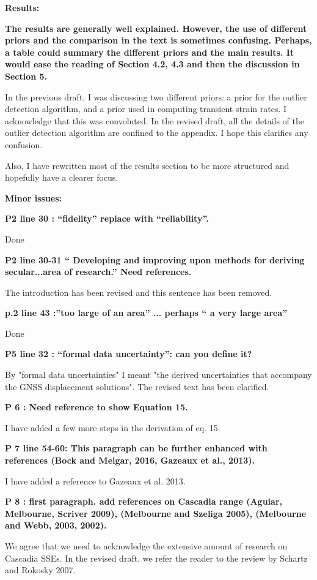 \documentclass[10pt,a4paper]{letter}
\begin{document}
\begin{letter}{}
\textbf{Results:}

\textbf{The results are generally well explained. However, the use of
different priors and the comparison in the text is sometimes
confusing. Perhaps, a table could summary the different priors and the
main results. It would ease the reading of Section 4.2, 4.3 and then
the discussion in Section 5.}

In the previous draft, I was discussing two different priors: a prior
for the outlier detection algorithm, and a prior used in computing
transient strain rates. I acknowledge that this was convoluted. In the
revised draft, all the details of the outlier detection algorithm are
confined to the appendix. I hope this clarifies any confusion.

Also, I have rewritten most of the results section to be more
structured and hopefully have a clearer focus.

\textbf{Minor issues:}

\textbf{P2 line 30 : “fidelity” replace with “reliability”.}

Done

\textbf{P2 line 30-31 “ Developing and improving upon methods for deriving
secular...area of research.” Need references.}

The introduction has been revised and this sentence has been removed.

\textbf{p.2 line 43 :”too large of an area” ... perhaps “ a very large area”}

Done

\textbf{P5 line 32 : “formal data uncertainty”: can you define it?}

By "formal data uncertainties" I meant "the derived uncertainties that
accompany the GNSS displacement solutions". The revised text has been
clarified.

\textbf{P 6 : Need reference to show Equation 15.}

I have added a few more steps in the derivation of eq. 15.

\textbf{P 7 line 54-60: This paragraph can be further enhanced with references
(Bock and Melgar, 2016, Gazeaux et al., 2013).}

I have added a reference to Gazeaux et al. 2013.

\textbf{P 8 : first paragraph. add references on Cascadia range (Aguiar,
Melbourne, Scriver 2009), (Melbourne and Szeliga 2005), (Melbourne and
Webb, 2003, 2002).}

We agree that we need to acknowledge the extensive amount of research
on Cascadia SSEs. In the revised draft, we refer the reader to the
review by Schartz and Rokosky 2007.


\end{letter}
\end{document}
